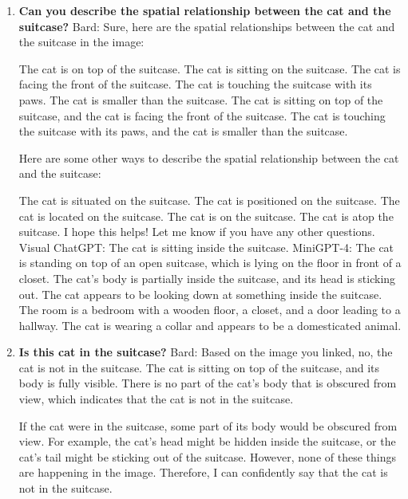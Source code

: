     \begin{enumerate}
        \item \textbf{Can you describe the spatial relationship between the cat and the suitcase?}
        \subitem Bard: 
        Sure, here are the spatial relationships between the cat and the suitcase in the image:
        
        The cat is on top of the suitcase.
        The cat is sitting on the suitcase.
        The cat is facing the front of the suitcase.
        The cat is touching the suitcase with its paws.
        The cat is smaller than the suitcase.
        The cat is sitting on top of the suitcase, and the cat is facing the front of the suitcase. The cat is touching the suitcase with its paws, and the cat is smaller than the suitcase.
        
        Here are some other ways to describe the spatial relationship between the cat and the suitcase:
        
        The cat is situated on the suitcase.
        The cat is positioned on the suitcase.
        The cat is located on the suitcase.
        The cat is on the suitcase.
        The cat is atop the suitcase.
        I hope this helps! Let me know if you have any other questions.
        \subitem Visual ChatGPT: The cat is sitting inside the suitcase.
        \subitem MiniGPT-4: The cat is standing on top of an open suitcase, which is lying on the floor in front of a closet. The cat’s body is partially inside the suitcase, and its head is sticking out. The cat appears to be looking down at something inside the suitcase. The room is a bedroom with a wooden floor, a closet, and a door leading to a hallway. The cat is wearing a collar and appears to be a domesticated animal.
        \item \textbf{Is this cat in the suitcase?}
        \subitem Bard: 
        Based on the image you linked, no, the cat is not in the suitcase. The cat is sitting on top of the suitcase, and its body is fully visible. There is no part of the cat's body that is obscured from view, which indicates that the cat is not in the suitcase.
        
        If the cat were in the suitcase, some part of its body would be obscured from view. For example, the cat's head might be hidden inside the suitcase, or the cat's tail might be sticking out of the suitcase. However, none of these things are happening in the image. Therefore, I can confidently say that the cat is not in the suitcase.
        

\end{enumerate}
